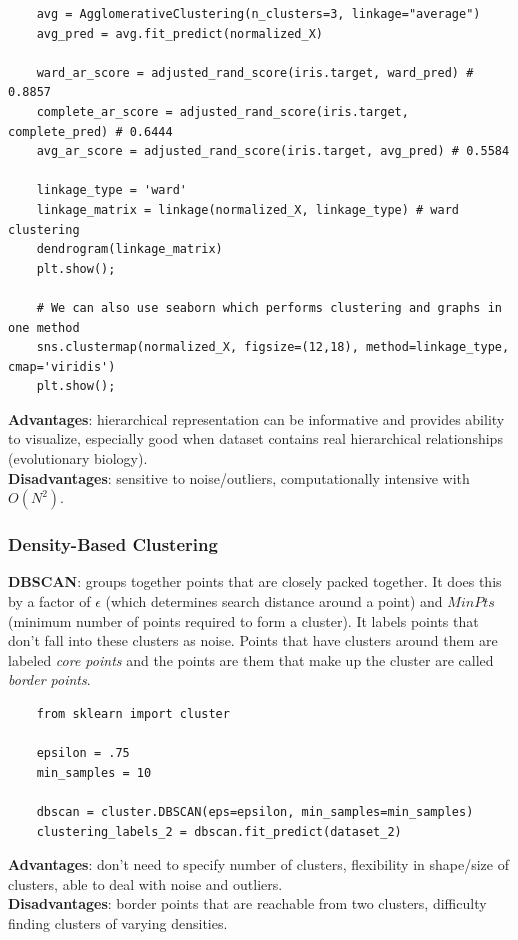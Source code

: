 \documentclass[11pt, a4paper]{article}
\begin{document}
\begin{spacing}{1.1}
\begin{lstlisting}
	avg = AgglomerativeClustering(n_clusters=3, linkage="average")
	avg_pred = avg.fit_predict(normalized_X)
	
	ward_ar_score = adjusted_rand_score(iris.target, ward_pred) # 0.8857
	complete_ar_score = adjusted_rand_score(iris.target, complete_pred) # 0.6444
	avg_ar_score = adjusted_rand_score(iris.target, avg_pred) # 0.5584
	
	linkage_type = 'ward'
	linkage_matrix = linkage(normalized_X, linkage_type) # ward clustering
	dendrogram(linkage_matrix)
	plt.show();
	
	# We can also use seaborn which performs clustering and graphs in one method
	sns.clustermap(normalized_X, figsize=(12,18), method=linkage_type, cmap='viridis')
	plt.show();
	\end{lstlisting}\vspace*{2mm}
	\textbf{Advantages}: hierarchical representation can be informative and provides ability to visualize, especially good when dataset contains real hierarchical relationships (evolutionary biology). \vspace*{2mm}\\
	\textbf{Disadvantages}: sensitive to noise/outliers, computationally intensive with $O(N^2)$.\vspace*{2mm}
	\subsubsection{Density-Based Clustering}
	\textbf{DBSCAN}: groups together points that are closely packed together. It does this by a factor of $\epsilon$ (which determines search distance around a point) and $MinPts$ (minimum number of points required to form a cluster). It labels points that don't fall into these clusters as noise. Points that have clusters around them are labeled \textit{core points} and the points are them that make up the cluster are called \textit{border points}. 
	\begin{lstlisting}
	from sklearn import cluster
	
	epsilon = .75
	min_samples = 10
	
	dbscan = cluster.DBSCAN(eps=epsilon, min_samples=min_samples)
	clustering_labels_2 = dbscan.fit_predict(dataset_2)
	\end{lstlisting} \vspace*{2mm}
	\textbf{Advantages}: don't need to specify number of clusters, flexibility in shape/size of clusters, able to deal with noise and outliers. \vspace*{2mm}\\
	\textbf{Disadvantages}: border points that are reachable from two clusters, difficulty finding clusters of varying densities. \newpage


\end{spacing}
\end{document}
